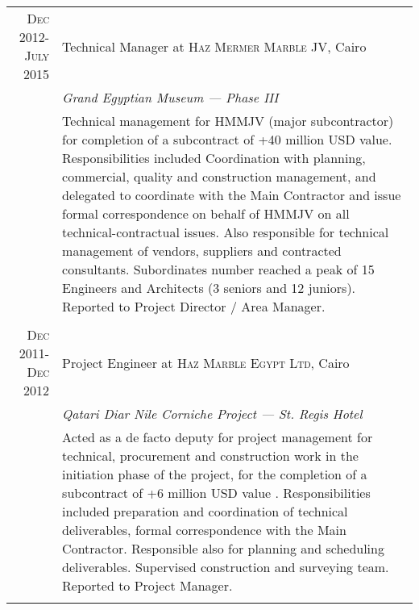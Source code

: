 \documentclass[a4paper,11pt]{article} %
\begin{document}
\begin{tabular}{r|p{11cm}}
\textsc{Dec 2012-July 2015} & Technical Manager at \textsc{Haz Mermer Marble JV}, Cairo\\
& \emph{Grand Egyptian Museum --- Phase III}\\ 
& \footnotesize{Technical management for HMMJV (major subcontractor) for completion of a subcontract of +40 million USD value. Responsibilities included Coordination with planning, commercial, quality and construction management, and delegated to coordinate with the Main Contractor and issue formal correspondence on behalf of HMMJV on all technical-contractual issues. Also responsible for technical management of vendors, suppliers and contracted consultants. Subordinates number reached a peak of 15 Engineers and Architects (3 seniors and 12 juniors). Reported to Project Director / Area Manager.}\\
\multicolumn{2}{c}{} \\


\textsc{Dec 2011-Dec 2012} & Project Engineer at \textsc{Haz Marble Egypt Ltd}, Cairo \\
& \emph{Qatari Diar Nile Corniche Project --- St. Regis Hotel} \\
& \footnotesize{Acted as a de facto deputy for project management for technical, procurement and construction work in the initiation phase of the project, for the completion of a subcontract of +6 million USD value . Responsibilities included preparation and coordination of technical deliverables, formal correspondence with the Main Contractor. Responsible also for planning and scheduling deliverables. Supervised construction and surveying team. Reported to Project Manager.}\\
\multicolumn{2}{c}{} \\



\end{tabular}
\end{document}
